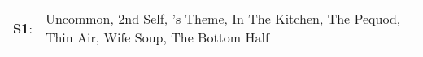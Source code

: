 \begin{supertabular}{p{0.03\textwidth}p{0.92\textwidth}}
 \textbf{S1}:  &  Uncommon\textsuperscript{}, \enspace 2nd Self\textsuperscript{}, 's Theme\textsuperscript{}, \enspace In The Kitchen\textsuperscript{}, \enspace The Pequod\textsuperscript{}, \enspace Thin Air\textsuperscript{}, \enspace Wife Soup\textsuperscript{}, \enspace The Bottom Half\textsuperscript{}  \enspace  \\
\end{supertabular}
